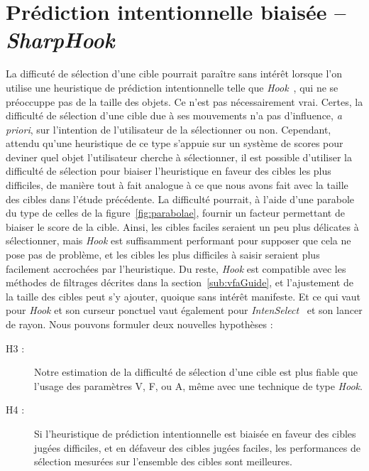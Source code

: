 	\section{Prédiction intentionnelle biaisée -- \emph{SharpHook}}
	La difficuté de sélection d'une cible pourrait paraître sans intérêt lorsque l'on utilise une heuristique de prédiction intentionnelle telle que \emph{Hook}~\cite{ortega2013hook}, qui ne se préoccuppe pas de la taille des objets. Ce n'est pas nécessairement vrai. Certes, la difficulté de sélection d'une cible due à ses mouvements n'a pas d'influence, \emph{a priori}, sur l'intention de l'utilisateur de la sélectionner ou non. Cependant, attendu qu'une heuristique de ce type s'appuie sur un système de scores pour deviner quel objet l'utilisateur cherche à sélectionner, il est possible d'utiliser la difficulté de sélection pour biaiser l'heuristique en faveur des cibles les plus difficiles, de manière tout à fait analogue à ce que nous avons fait avec la taille des cibles dans l'étude précédente. La difficulté pourrait, à l'aide d'une parabole du type de celles de la figure~\ref{fig:parabolae}, fournir un facteur permettant de biaiser le score de la cible. Ainsi, les cibles faciles seraient un peu plus délicates à sélectionner, mais \emph{Hook} est suffisamment performant pour supposer que cela ne pose pas de problème, et les cibles les plus difficiles à saisir seraient plus facilement accrochées par l'heuristique. Du reste, \emph{Hook} est compatible avec les méthodes de filtrages décrites dans la section~\ref{sub:vfaGuide}, et l'ajustement de la taille des cibles peut s'y ajouter, quoique sans intérêt manifeste. Et ce qui vaut pour \emph{Hook} et son curseur ponctuel vaut également pour \emph{IntenSelect}~\cite{de2005intenselect} et son lancer de rayon. Nous pouvons formuler deux nouvelles hypothèses :
	
	\begin{description}
		\item[H3 :] Notre estimation de la difficulté de sélection d'une cible est plus fiable que l'usage des paramètres V, F, ou A, même avec une technique de type \emph{Hook}.
		\item[H4 :] Si l'heuristique de prédiction intentionnelle est biaisée en faveur des cibles jugées difficiles, et en défaveur des cibles jugées faciles, les performances de sélection mesurées sur l'ensemble des cibles sont meilleures.
	\end{description}

	
